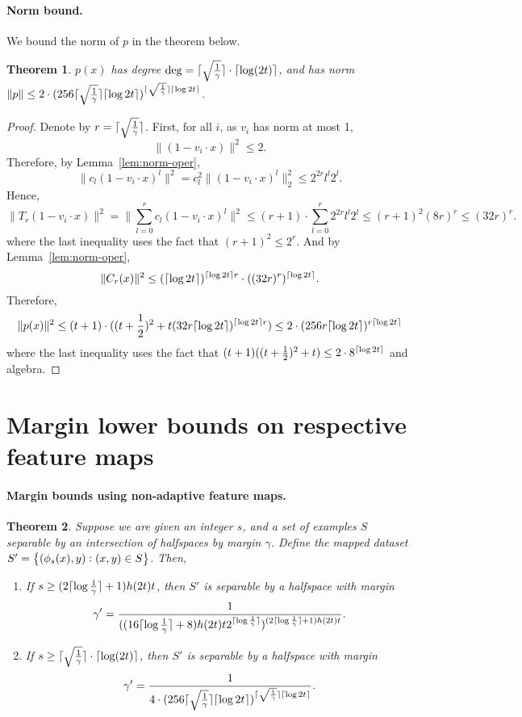 \documentclass{article}
\DeclarePairedDelimiter\ceil{\lceil}{\rceil}
\newtheorem{theorem}{Theorem}
\begin{document}
\paragraph{Norm bound.} We bound the norm of $p$ in the theorem below.
\begin{theorem}
$p(x)$ has degree $\deg = \ceil{\sqrt{\frac1\gamma}} \cdot \ceil{\log(2t)}$, and has norm $\|p\| \leq 2 \cdot (256 \ceil{\sqrt{\frac1\gamma}} \ceil{\log 2t})^{\ceil{\sqrt{\frac1\gamma}} \ceil{\log 2t}}$.
\end{theorem}
\begin{proof}
Denote by $r = \ceil{\sqrt{\frac1\gamma}}$.
First, for all $i$, as $v_i$ has norm at most 1,
\[ \| (1 - v_i \cdot x) \|^2 \leq 2. \]
Therefore, by Lemma~\ref{lem:norm-oper},
\[ \| c_l (1 - v_i \cdot x)^l \|^2 = c_l^2 \| (1 - v_i \cdot x)^l \|_2^2 \leq 2^{2r} l^l 2^l. \]
Hence,
\[ \| T_r(1 - v_i \cdot x) \|^2 = \| \sum_{l=0}^r c_l (1 - v_i \cdot x)^l \|^2 \leq (r+1) \cdot \sum_{l=0}^r 2^{2r} l^l 2^l \leq (r+1)^2 (8r)^r \leq (32r)^r. \]
where the last inequality uses the fact that $(r+1)^2 \leq 2^r$.
And by Lemma~\ref{lem:norm-oper},
\[ \| C_r(x) \|^2 \leq (\ceil{\log 2t})^{\ceil{\log 2t} r} \cdot ((32r)^r)^{\ceil{\log 2t}}. \]
Therefore,
\[ \| p(x) \|^2 \leq (t+1) \cdot ((t+\frac 1 2)^2 + t (32 r\ceil{\log 2t})^{\ceil{\log 2t} r}) \leq 2 \cdot (256 r \ceil{\log 2t})^{r \ceil{\log 2t}}  \]
where the last inequality uses the fact that $(t+1)((t+\frac12)^2+t) \leq 2 \cdot 8^{\ceil{\log 2t}}$ and algebra.
\end{proof}

\section{Margin lower bounds on respective feature maps}
\paragraph{Margin bounds using non-adaptive feature maps.}
\begin{theorem}
Suppose we are given an integer $s$, and a set of examples $S$ separable by an intersection of halfspaces by margin $\gamma$. Define the mapped dataset $S'=\cbr{(\phi_s(x),y): (x,y) \in S}$. Then,
\begin{enumerate}
\item If $s \geq (2\ceil{\log \frac 1 \gamma}+1) h(2t) t$, then $S'$ is separable by a halfspace with margin
\[
\gamma' = \frac{1}{ ( (16 \ceil{\log \frac 1 \gamma} + 8 ) h(2t) t 2^{\ceil{\log \frac 1 \gamma}})^{(2\ceil{\log \frac 1 \gamma} + 1 ) h(2t) t} }.
\]
\item If $s \geq \ceil{\sqrt{\frac1\gamma}} \cdot \ceil{\log(2t)}$, then $S'$ is separable by a halfspace with margin
\[
\gamma' = \frac{1}{4 \cdot (256 \ceil{\sqrt{\frac1\gamma}} \ceil{\log 2t})^{\ceil{\sqrt{\frac1\gamma}} \ceil{\log 2t}}}.
\]
\end{enumerate}
\end{theorem}
\end{document}
